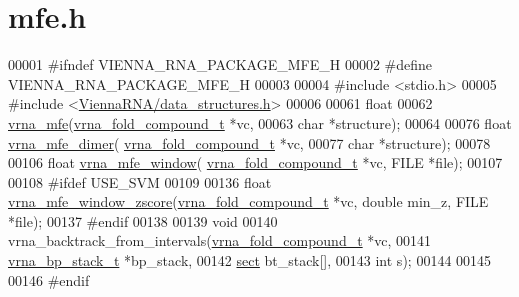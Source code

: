 \hypertarget{mfe_8h_source}{}\section{mfe.\+h}
\label{mfe_8h_source}

\begin{DoxyCode}
00001 \textcolor{preprocessor}{#ifndef VIENNA\_RNA\_PACKAGE\_MFE\_H}
00002 \textcolor{preprocessor}{#define VIENNA\_RNA\_PACKAGE\_MFE\_H}
00003 
00004 \textcolor{preprocessor}{#include <stdio.h>}
00005 \textcolor{preprocessor}{#include <\hyperlink{data__structures_8h}{ViennaRNA/data\_structures.h}>}
00006 
00061 \textcolor{keywordtype}{float}
00062 \hyperlink{group__mfe__fold_gabd3b147371ccf25c577f88bbbaf159fd}{vrna\_mfe}(\hyperlink{group__fold__compound_structvrna__fc__s}{vrna\_fold\_compound\_t} *vc,
00063           \textcolor{keywordtype}{char} *structure);
00064 
00076 \textcolor{keywordtype}{float} \hyperlink{group__mfe__cofold_gaab22d10c1190f205f16a77cab9d5d3ee}{vrna\_mfe\_dimer}( \hyperlink{group__fold__compound_structvrna__fc__s}{vrna\_fold\_compound\_t} *vc,
00077                       \textcolor{keywordtype}{char} *structure);
00078 
00106 \textcolor{keywordtype}{float} \hyperlink{group__local__mfe__fold_ga689df235a1915a1ad56e377383c044ce}{vrna\_mfe\_window}( \hyperlink{group__fold__compound_structvrna__fc__s}{vrna\_fold\_compound\_t} *vc, FILE *file);
00107 
00108 \textcolor{preprocessor}{#ifdef USE\_SVM}
00109 
00136 \textcolor{keywordtype}{float} \hyperlink{group__local__mfe__fold_gaa4f67ae94efd08d800c17f9b53423fd6}{vrna\_mfe\_window\_zscore}(\hyperlink{group__fold__compound_structvrna__fc__s}{vrna\_fold\_compound\_t} *vc, \textcolor{keywordtype}{double} 
      min\_z, FILE *file);
00137 \textcolor{preprocessor}{#endif}
00138 
00139 \textcolor{keywordtype}{void}
00140 vrna\_backtrack\_from\_intervals(\hyperlink{group__fold__compound_structvrna__fc__s}{vrna\_fold\_compound\_t} *vc,
00141                               \hyperlink{group__data__structures_structvrna__bp__stack__s}{vrna\_bp\_stack\_t} *bp\_stack,
00142                               \hyperlink{group__data__structures_structvrna__sect__s}{sect} bt\_stack[],
00143                               \textcolor{keywordtype}{int} s);
00144 
00145 
00146 \textcolor{preprocessor}{#endif}
\end{DoxyCode}
